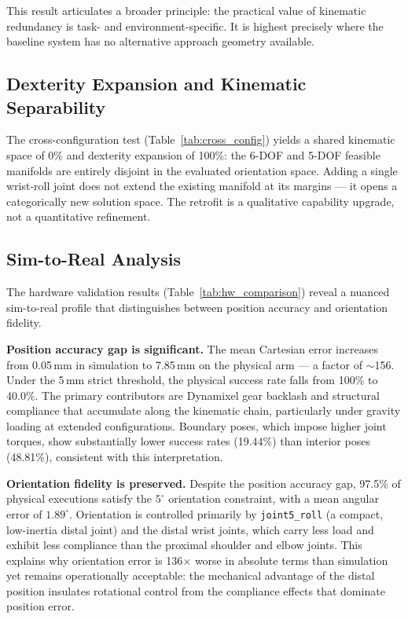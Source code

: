 \documentclass[conference]{IEEEtran}
\begin{document}
	This result articulates a broader principle: the practical
	value of kinematic redundancy is task- and environment-specific.
	It is highest precisely where the baseline system has no
	alternative approach geometry available.
	
	\subsection{Dexterity Expansion and Kinematic Separability}
	
	The cross-configuration test (Table~\ref{tab:cross_config})
	yields a shared kinematic space of 0\% and dexterity expansion
	of 100\%: the 6-DOF and 5-DOF feasible manifolds are
	entirely disjoint in the evaluated orientation space. Adding a
	single wrist-roll joint does not extend the existing manifold
	at its margins — it opens a categorically new solution space.
	The retrofit is a qualitative capability upgrade, not a
	quantitative refinement.
	
	\subsection{Sim-to-Real Analysis}
	\label{sec:sim_to_real}
	
	The hardware validation results (Table~\ref{tab:hw_comparison})
	reveal a nuanced sim-to-real profile that distinguishes between
	position accuracy and orientation fidelity.
	
	\textbf{Position accuracy gap is significant.}
	The mean Cartesian error increases from 0.05\,mm in simulation
	to 7.85\,mm on the physical arm — a factor of $\sim$156. Under
	the 5\,mm strict threshold, the physical success rate falls from
	100\% to 40.0\%. The primary contributors are Dynamixel gear
	backlash and structural compliance that accumulate along the
	kinematic chain, particularly under gravity loading at extended
	configurations. Boundary poses, which impose higher joint
	torques, show substantially lower success rates (19.44\%) than
	interior poses (48.81\%), consistent with this interpretation.
	
	\textbf{Orientation fidelity is preserved.}
	Despite the position accuracy gap, 97.5\% of physical
	executions satisfy the $5^\circ$ orientation constraint, with
	a mean angular error of $1.89^\circ$. Orientation is controlled
	primarily by \texttt{joint5\_roll} (a compact, low-inertia
	distal joint) and the distal wrist joints, which carry less
	load and exhibit less compliance than the proximal shoulder and
	elbow joints. This explains why orientation error is 136$\times$
	worse in absolute terms than simulation yet remains
	operationally acceptable: the mechanical advantage of the
	distal position insulates rotational control from the
	compliance effects that dominate position error.
	
\end{document}
